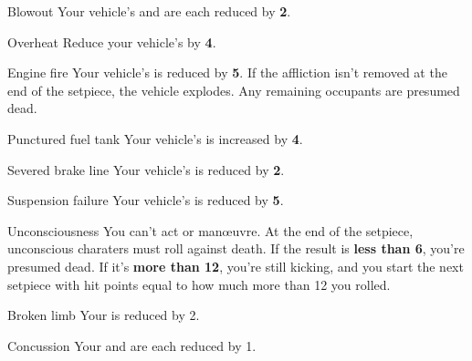 
\begin{describe}{Blowout}
  Your vehicle's  and  are each reduced by \textbf{2}.
\end{describe}

\begin{describe}{Overheat}
  Reduce your vehicle's  by \textbf{4}.
\end{describe}

\begin{describe}{Engine fire}
  Your vehicle's  is reduced by \textbf{5}. If the affliction isn't removed at the end of the setpiece, the vehicle explodes. Any remaining occupants are presumed dead.
\end{describe}

\begin{describe}{Punctured fuel tank}
  Your vehicle's  is increased by \textbf{4}.
\end{describe}

\begin{describe}{Severed brake line}
  Your vehicle's  is reduced by \textbf{2}.
\end{describe}

\begin{describe}{Suspension failure}
  Your vehicle's  is reduced by \textbf{5}.
\end{describe}

\hr

\begin{describe}{Unconsciousness}
  You can't act or man\oe{}uvre. At the end of the setpiece, unconscious charaters must roll  against death. If the result is \textbf{less than 6}, you're presumed dead. If it's \textbf{more than 12}, you're still kicking, and you start the next setpiece with hit points equal to how much more than 12 you rolled.
\end{describe}

\begin{describe}{Broken limb}
  Your  is reduced by 2.
\end{describe}

\begin{describe}{Concussion}
  Your  and  are each reduced by 1.
\end{describe}

